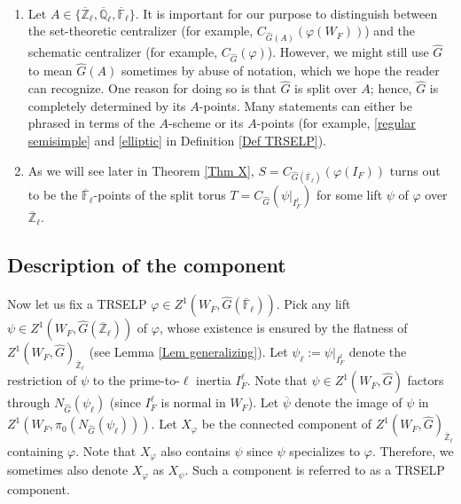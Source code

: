   \begin{remark}\
  	\begin{enumerate}
  		\item Let $A \in \{\overline{\mathbb{Z}}_{\ell}, \overline{\mathbb{Q}}_{\ell}, \overline{\mathbb{F}}_{\ell}\}$. It is important for our purpose to distinguish between the set-theoretic centralizer (for example, $C_{\hat{G}(A)}(\varphi(W_F))$) and the schematic centralizer (for example, $C_{\hat{G}}(\varphi)$). However, we might still use $\hat{G}$ to mean $\hat{G}(A)$ sometimes by abuse of notation, which we hope the reader can recognize. One reason for doing so is that $\hat{G}$ is split over $A$; hence, $\hat{G}$ is completely determined by its $A$-points. Many statements can either be phrased in terms of the $A$-scheme or its $A$-points (for example, \ref{regular semisimple} and \ref{elliptic} in Definition \ref{Def TRSELP}).
  		\item As we will see later in Theorem \ref{Thm X}, $S=C_{\hat{G}(\overline{\mathbb{F}}_{\ell})}(\varphi(I_F))$ turns out to be the $\overline{\mathbb{F}}_{\ell}$-points of the split torus $T=C_{\hat{G}}(\psi|_{I_F^{\ell}})$ for some lift $\psi$ of $\varphi$ over $\overline{\mathbb{Z}}_{\ell}$.
  	\end{enumerate}
  \end{remark}

\subsection{Description of the component}\label{Subsection the component}

Now let us fix a TRSELP $\varphi \in Z^1(W_F, \hat{G}(\overline{\mathbb{F}}_{\ell}))$. Pick any lift $\psi \in Z^1(W_F, \hat{G}(\overline{\mathbb{Z}}_{\ell}))$ of $\varphi$, whose existence is ensured by the flatness of $Z^1(W_F, \hat{G})_{\overline{\mathbb{Z}}_{\ell}}$ (see Lemma \ref{Lem generalizing}). Let $\psi_{\ell}:=\psi|_{I_F^{\ell}}$ denote the restriction of $\psi$ to the prime-to-$\ell$ inertia $I_F^{\ell}$. Note that $\psi \in Z^1(W_F, \hat{G})$ factors through $N_{\hat{G}}(\psi_{\ell})$ (since $I_F^{\ell}$ is normal in $W_F$). Let $\overline{\psi}$ denote the image of $\psi$ in $Z^1(W_F, \pi_0(N_{\hat{G}}(\psi_{\ell})))$. Let $X_{\varphi}$ be the connected component of $Z^1(W_F, \hat{G})_{\overline{\mathbb{Z}}_{\ell}}$ containing $\varphi$. Note that $X_{\varphi}$ also contains $\psi$ since $\psi$ specializes to $\varphi$. Therefore,  we sometimes also denote $X_{\varphi}$ as $X_{\psi}$. Such a component is referred to as a TRSELP component.


